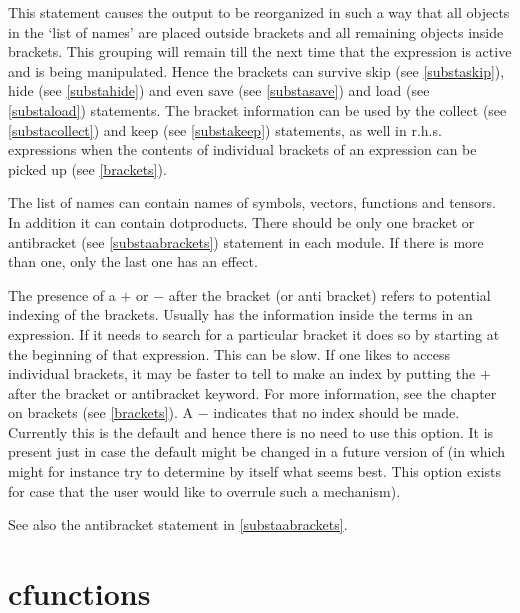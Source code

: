 \noindent This statement causes the output to be reorganized in such a way 
that all objects in the `list of names' are placed outside 
brackets and all remaining objects inside 
brackets. This grouping will remain till the next time that 
the expression is active and is being manipulated. Hence the brackets can 
survive skip (see \ref{substaskip}), hide (see \ref{substahide}) and even 
save (see \ref{substasave}) and load (see \ref{substaload}) statements. The 
bracket information can be used by the collect (see \ref{substacollect}) 
and keep (see \ref{substakeep}) statements, as well in r.h.s. expressions 
when the contents of individual brackets of an expression can be picked up 
(see \ref{brackets}). \vspace{4mm}

\noindent The list of names can contain names of symbols, vectors, 
functions and tensors. In addition it can contain dotproducts. There should 
be only one bracket or antibracket (see \ref{substaabrackets}) statement 
in each module. If there is more than one, only the last one has an effect. 
\vspace{4mm}

\noindent The presence of a $+$ or $-$ after the bracket (or anti bracket) 
refers to potential indexing of the brackets. 
Usually {\FORM} has the information inside the terms in an expression. If 
it needs to search for a particular bracket it does so by starting at the 
beginning of that expression. This can be slow. If one likes to access 
individual brackets, it may be faster to tell {\FORM} to make an index by 
putting the $+$ after the bracket or antibracket keyword. For more 
information, see the chapter on brackets (see \ref{brackets}). A $-$ 
indicates that no index should be made. Currently this is the default and 
hence there is no need to use this option. It is present just in case the 
default might be changed in a future version of {\FORM} (in which {\FORM} 
might for instance try to determine by itself what seems best. This option 
exists for case that the user would like to overrule such a mechanism). 
\vspace{4mm}

\noindent See also the antibracket statement in \ref{substaabrackets}.
\vspace{10mm}


\section{cfunctions}
\label{substacfunctions}

